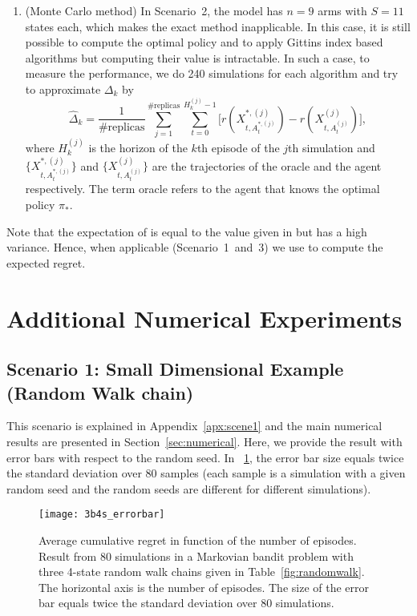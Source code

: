 \begin{subappendices}
\begin{enumerate}
    \item (Monte Carlo method) In Scenario~2, the model has $n=9$ arms with $S=11$ states each, which makes the exact method inapplicable. In this case, it is still possible to compute the optimal policy and to apply Gittins index based algorithms but computing their value is intractable. In such a case, to measure the performance, we do 240 simulations for each algorithm and try to approximate $\Delta_k$ by
    \begin{equation}
        \label{eq:simulation_value}
        \hat{\Delta}_k=\frac1{\text{\#replicas}}\sum_{j=1}^{\text{\#replicas}}\sum_{t=0}^{H_k^{(j)}-1}\Big[r(X_{t,A^{*,(j)}_t}^{*,(j)}) -r(X_{t,A^{(j)}_t}^{(j)})\Big],
    \end{equation}
    where $H_k^{(j)}$ is the horizon of the $k$th episode of the $j$th simulation and $\{X_{t,A^{*,(j)}_t}^{*,(j)}\}$ and $\{X_{t,A^{(j)}_t}^{(j)}\}$ are the trajectories of the oracle and the agent respectively. The term oracle refers to the agent that knows the optimal policy $\pi_*$.
\end{enumerate}
Note that the expectation of  is equal to the value given in  but  has a high variance. Hence, when applicable (Scenario~1~and~3) we use  to compute the expected regret.

\section{Additional Numerical Experiments}
\label{apx:add_numerical}

\subsection{Scenario 1: Small Dimensional Example (Random Walk chain)}
\label{sssec:random_walk}

This scenario is explained in Appendix~\ref{apx:scene1} and the main numerical results are presented in Section~\ref{sec:numerical}. Here, we provide the result with error bars with respect to the random seed. In \figurename~\ref{fig:randomwalk_3b4s_errorbar}, the error bar size equals twice the standard deviation over 80 samples (each sample is a simulation with a given random seed and the random seeds are different for different simulations).

\begin{figure}[ht]
    \center
    \texttt{[image: 3b4s\_errorbar]}
    \caption{Average cumulative regret in function of the number of episodes. Result from 80 simulations in a Markovian bandit problem with three 4-state random walk chains given in Table~\ref{fig:randomwalk}. The horizontal axis is the number of episodes. The size of the error bar equals twice the standard deviation over 80 simulations.}
    \label{fig:randomwalk_3b4s_errorbar}
\end{figure}


\end{subappendices}
